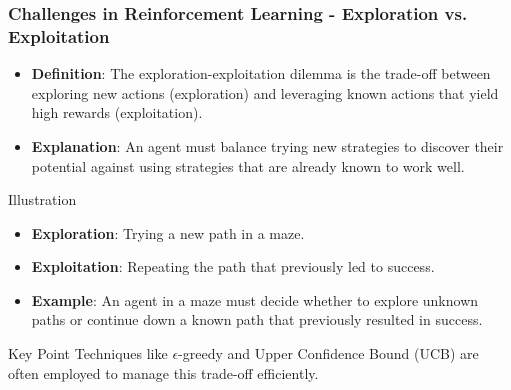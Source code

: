\documentclass[aspectratio=169]{beamer}
\begin{document}
\begin{frame}[fragile]
    \frametitle{Challenges in Reinforcement Learning - Exploration vs. Exploitation}
    \begin{itemize}
        \item \textbf{Definition}: The exploration-exploitation dilemma is the trade-off between exploring new actions (exploration) and leveraging known actions that yield high rewards (exploitation).
        \item \textbf{Explanation}: An agent must balance trying new strategies to discover their potential against using strategies that are already known to work well.
    \end{itemize}
    
    \begin{block}{Illustration}
        \begin{itemize}
            \item \textbf{Exploration}: Trying a new path in a maze.
            \item \textbf{Exploitation}: Repeating the path that previously led to success.
        \end{itemize}
    \end{block}
    
    \begin{itemize}
        \item \textbf{Example}: An agent in a maze must decide whether to explore unknown paths or continue down a known path that previously resulted in success.
    \end{itemize}
    
    \begin{block}{Key Point}
        Techniques like $\epsilon$-greedy and Upper Confidence Bound (UCB) are often employed to manage this trade-off efficiently.
    \end{block}
\end{frame}
\end{document}
